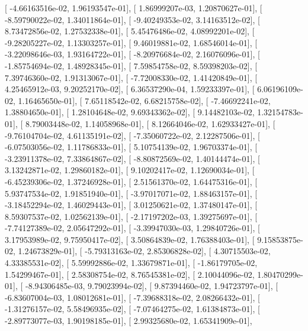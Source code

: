 \documentclass{article}
\begin{document}
       [ -4.66163516e-02,   1.96193547e-01],
       [  1.86999207e-03,   1.20870627e-01],
       [ -8.59790022e-02,   1.34011864e-01],
       [ -9.40249353e-02,   3.14163512e-02],
       [  8.73472856e-02,   1.27532338e-01],
       [  5.45476486e-02,   4.08992201e-02],
       [ -9.28205227e-02,   1.13303257e-01],
       [  9.46019881e-02,   1.68546014e-01],
       [ -3.22098646e-03,   1.93164722e-01],
       [ -8.20976684e-02,   2.16076096e-01],
       [ -1.85754694e-02,   1.48928345e-01],
       [  7.59854758e-02,   8.59398203e-02],
       [  7.39746360e-02,   1.91313067e-01],
       [ -7.72008330e-02,   1.41420849e-01],
       [  4.25465912e-03,   9.20252170e-02],
       [  6.36537290e-04,   1.59233397e-01],
       [  6.06196109e-02,   1.16465650e-01],
       [  7.65118542e-02,   6.68215758e-02],
       [ -7.46692241e-02,   1.38804650e-01],
       [  1.28104648e-02,   9.69343362e-02],
       [  9.14482103e-02,   1.32154783e-01],
       [  8.79003448e-02,   1.14058968e-01],
       [  8.12664046e-02,   1.62933427e-01],
       [ -9.76104704e-02,   4.61135191e-02],
       [ -7.35060722e-02,   2.12287506e-01],
       [ -6.07503056e-02,   1.11786833e-01],
       [  5.10754139e-02,   1.96703374e-01],
       [ -3.23911378e-02,   7.33864867e-02],
       [ -8.80872569e-02,   1.40144474e-01],
       [  3.13242871e-02,   1.29860182e-01],
       [  9.10202417e-02,   1.12690034e-01],
       [ -6.45239306e-02,   1.37246928e-01],
       [  2.51561370e-02,   1.64475316e-01],
       [  5.93747534e-02,   1.91851940e-01],
       [ -3.97017071e-02,   1.88463157e-01],
       [ -3.18452294e-02,   1.46029443e-01],
       [  3.01250621e-02,   1.37480147e-01],
       [  8.59307537e-02,   1.02562139e-01],
       [ -2.17197202e-03,   1.39275697e-01],
       [ -7.74127389e-02,   2.05647292e-01],
       [ -3.39947030e-03,   1.29840726e-01],
       [  3.17953989e-02,   9.75950417e-02],
       [  3.50864839e-02,   1.76388403e-01],
       [  9.15853875e-02,   1.24673829e-01],
       [ -5.79313163e-02,   2.85306828e-02],
       [  4.30715503e-02,   4.33385531e-02],
       [  5.59992886e-02,   1.33679871e-01],
       [ -1.86179705e-02,   1.54299467e-01],
       [  2.58308754e-02,   8.76545381e-02],
       [  2.10044096e-02,   1.80470299e-01],
       [ -8.94306485e-03,   9.79023994e-02],
       [  9.87394460e-02,   1.94723797e-01],
       [ -6.83607004e-03,   1.08012681e-01],
       [ -7.39688318e-02,   2.08266432e-01],
       [ -1.31276157e-02,   5.58496935e-02],
       [ -7.07464275e-02,   1.61384873e-01],
       [ -2.89773077e-03,   1.90198185e-01],
       [  2.99325680e-02,   1.65341909e-01],
\end{document}
